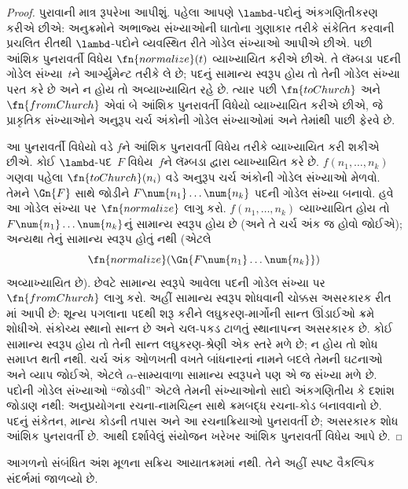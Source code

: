 \begin{proof}
  પુરાવાની માત્ર રૂપરેખા આપીશું. પહેલા આપણે
  $\lambd$-પદોનું અંકગણિતીકરણ કરીએ છીએ: અનુક્રમોને
  અભાજ્ય સંખ્યાઓની ઘાતોના ગુણાકાર તરીકે સંકેતિત કરવાની પ્રચલિત રીતથી
  $\lambd$-પદોને વ્યવસ્થિત રીતે ગોડેલ સંખ્યાઓ આપીએ
  છીએ. પછી આંશિક પુનરાવર્તી વિધેય
  $\fn{normalize}(t)$ વ્યાખ્યાયિત કરીએ છીએ. તે
  લૅમ્બડા પદની ગોડેલ સંખ્યા~$t$ને આર્ગ્યુમેન્ટ
  તરીકે લે છે; પદનું સામાન્ય સ્વરૂપ હોય તો તેની
  ગોડેલ સંખ્યા પરત કરે છે અને ન હોય તો
  અવ્યાખ્યાયિત રહે છે. ત્યાર પછી $\fn{toChurch}$
  અને $\fn{fromChurch}$ એવાં બે આંશિક પુનરાવર્તી
  વિધેયો વ્યાખ્યાયિત કરીએ છીએ, જે પ્રાકૃતિક સંખ્યાઓને
  અનુરૂપ ચર્ચ અંકોની ગોડેલ સંખ્યાઓમાં અને તેમાંથી
  પાછી ફેરવે છે.

  આ પુનરાવર્તી વિધેયો વડે $f$ને આંશિક પુનરાવર્તી
  વિધેય તરીકે વ્યાખ્યાયિત કરી શકીએ છીએ. કોઈ
  $\lambd$-પદ~$F$ વિધેય~$f$ને લૅમ્બડા દ્વારા વ્યાખ્યાયિત
  કરે છે. $f(n_1, \dots, n_k)$ ગણવા પહેલા
  $\fn{toChurch}(n_i)$ વડે અનુરૂપ ચર્ચ અંકોની
  ગોડેલ સંખ્યાઓ મેળવો. તેમને $\Gn{F}$ સાથે જોડીને
  $F \num{n_1}\dots\num{n_k}$ પદની ગોડેલ સંખ્યા
  બનાવો. હવે આ ગોડેલ સંખ્યા પર $\fn{normalize}$
  લાગુ કરો. $f(n_1, \dots, n_k)$ વ્યાખ્યાયિત હોય
  તો $F \num{n_1}\dots\num{n_k}$નું સામાન્ય સ્વરૂપ
  હોય છે (અને તે ચર્ચ અંક જ હોવો જોઈએ); અન્યથા
  તેનું સામાન્ય સ્વરૂપ હોતું નથી (એટલે
  \[\fn{normalize}(\Gn{F\num{n_1}\dots\num{n_k}})\]
  અવ્યાખ્યાયિત છે). છેવટે સામાન્ય સ્વરૂપે આવેલા
  પદની ગોડેલ સંખ્યા પર $\fn{fromChurch}$ લાગુ કરો.
  અહીં સામાન્ય સ્વરૂપ શોધવાની ચોક્કસ અસરકારક રીત
  માં આપી છે:
  શૂન્ય પગલાના પદથી શરૂ કરીને લઘુકરણ-માર્ગોની સાન્ત
  ઊંડાઈઓ ક્રમે શોધીએ. સંકોચ્ય સ્થાનો સાન્ત છે અને
  ચલ-પકડ ટાળતું સ્થાનાપન્ન અસરકારક છે. કોઈ સામાન્ય
  સ્વરૂપ હોય તો તેની સાન્ત લઘુકરણ-શ્રેણી એક સ્તરે મળે છે;
  ન હોય તો શોધ સમાપ્ત થતી નથી.
  ચર્ચ અંક ઓળખતી વખતે બાંધનારનાં નામને બદલે તેમની
  ઘટનાઓ અને વ્યાપ જોઈએ, એટલે $\alpha$-સામ્યવાળા
  સામાન્ય સ્વરૂપને પણ એ જ સંખ્યા મળે છે.
  પદોની ગોડેલ સંખ્યાઓ “જોડવી” એટલે તેમની સંખ્યાઓનો
  સાદો અંકગણિતીય કે દશાંશ જોડાણ નથી: અનુપ્રયોગના
  રચના-નામચિહ્ન સાથે ક્રમબદ્ધ રચના-કોડ બનાવવાનો છે.
  પદનું સંકેતન, માન્ય કોડની તપાસ અને આ રચનાક્રિયાઓ
  પુનરાવર્તી છે; અસરકારક શોધ આંશિક પુનરાવર્તી છે.
  આથી દર્શાવેલું સંયોજન ખરેખર આંશિક પુનરાવર્તી વિધેય આપે છે.
\end{proof}
\endgroup


\OLEndChapterHook


\begin{editorial}
આગળનો સંબંધિત અંશ મૂળના સક્રિય આયાતક્રમમાં નથી. તેને અહીં સ્પષ્ટ વૈકલ્પિક સંદર્ભમાં જાળવ્યો છે.
\end{editorial}
\begingroup
\makeatletter{}\makeatother

